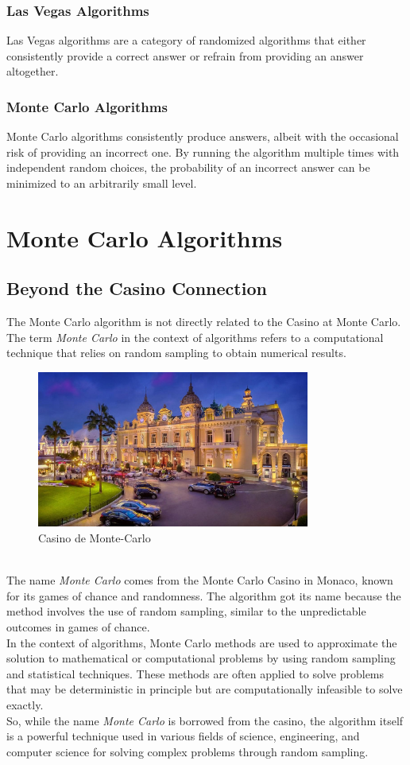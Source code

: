 \documentclass[12pt]{article}
\begin{document}
    \subsubsection{Las Vegas Algorithms}
    Las Vegas algorithms are a category of randomized algorithms that either consistently provide a correct answer or refrain from providing an answer altogether.
    \subsubsection{Monte Carlo Algorithms}
    Monte Carlo algorithms consistently produce answers, albeit with the occasional risk of providing an incorrect one. By running the algorithm multiple times with independent random choices, the probability of an incorrect answer can be minimized to an arbitrarily small level.

    \section{Monte Carlo Algorithms}
    \subsection{Beyond the Casino Connection}
    The Monte Carlo algorithm is not directly related to the Casino at Monte Carlo. The term \textit{Monte Carlo} in the context of algorithms refers to a computational technique that relies on random sampling to obtain numerical results.
    \begin{figure}[h]
        \centering
        \includegraphics[width=0.8\textwidth]{figures/casino.jpg}
        \caption{Casino de Monte-Carlo}
        \label{fig:casino}
    \end{figure}\\
    The name \textit{Monte Carlo} comes from the Monte Carlo Casino in Monaco, known for its games of chance and randomness. The algorithm got its name because the method involves the use of random sampling, similar to the unpredictable outcomes in games of chance.
    \\In the context of algorithms, Monte Carlo methods are used to approximate the solution to mathematical or computational problems by using random sampling and statistical techniques. These methods are often applied to solve problems that may be deterministic in principle but are computationally infeasible to solve exactly.\\
    So, while the name \textit{Monte Carlo} is borrowed from the casino, the algorithm itself is a powerful technique used in various fields of science, engineering, and computer science for solving complex problems through random sampling.
\end{document}
